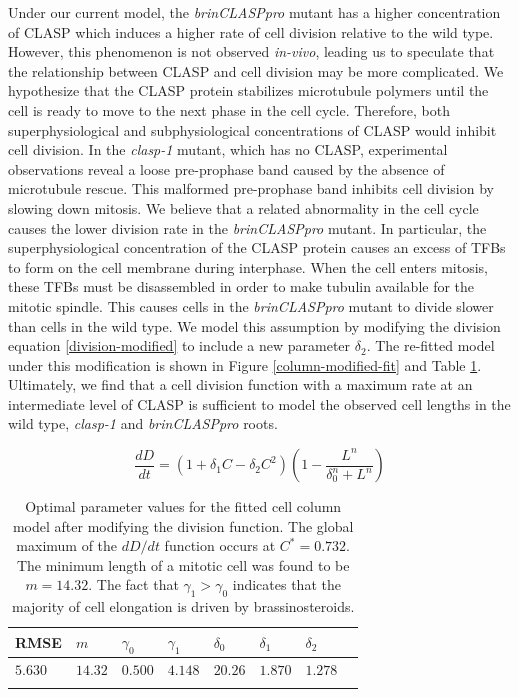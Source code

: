 \documentclass[referee,pdflatex,sn-mathphys-num]{sn-jnl}
\begin{document}
Under our current model, the \emph{brinCLASPpro} mutant has a higher concentration of CLASP which induces a higher rate of cell division relative to the wild type.
However, this phenomenon is not observed \emph{in-vivo}, leading us to speculate that the relationship between CLASP and cell division may be more complicated.
We hypothesize that the CLASP protein stabilizes microtubule polymers until the cell is ready to move to the next phase in the cell cycle.
Therefore, both superphysiological and subphysiological concentrations of CLASP would inhibit cell division.
In the \emph{clasp-1} mutant, which has no CLASP, experimental observations reveal a loose pre-prophase band \cite{ambrose2007} caused by the absence of microtubule rescue.
This malformed pre-prophase band inhibits cell division by slowing down mitosis.
We believe that a related abnormality in the cell cycle causes the lower division rate in the \emph{brinCLASPpro} mutant.
In particular, the superphysiological concentration of the CLASP protein causes an excess of TFBs to form on the cell membrane during interphase.
When the cell enters mitosis, these TFBs must be disassembled in order to make tubulin available for the mitotic spindle. 
This causes cells in the \emph{brinCLASPpro} mutant to divide slower than cells in the wild type.
We model this assumption by modifying the division equation \eqref{division-modified} to include a new parameter $\delta_{2}$.
The re-fitted model under this modification is shown in Figure \ref{column-modified-fit} and Table \ref{column-modified-parameters}.
Ultimately, we find that a cell division function with a maximum rate at an intermediate level of CLASP is sufficient to model the observed cell lengths in the wild type, \emph{clasp-1} and \emph{brinCLASPpro} roots.

\begin{equation}
\label{division-modified}
\frac{dD}{dt} = \left( 1 + \delta_{1} C - \delta_{2} C^{2} \right)\left( 1 - \frac{L^{n}}{\delta_{0}^{n} + L^{n}} \right) 
\end{equation}


\begin{table}[!ht]
\centering
\caption{Optimal parameter values for the fitted cell column model after modifying the division function.
The global maximum of the $dD/dt$ function occurs at $C^{*} = 0.732$.
The minimum length of a mitotic cell was found to be $m = 14.32$.
The fact that $\gamma_{1} > \gamma_{0}$ indicates that the majority of cell elongation is driven by brassinosteroids. }
\label{column-modified-parameters}
\begin{tabular}{@{}llllllll@{}}
\toprule
RMSE & $m$ & $\gamma_{0}$ & $\gamma_{1}$ & $\delta_{0}$ & $ \delta_{1}$ & $\delta_{2}$ \\
\midrule
$5.630$ & $14.32$ & $0.500$ & $4.148$ & $20.26$ & $1.870$ & $1.278$ \\
\botrule
\end{tabular}
\end{table}
\end{document}
